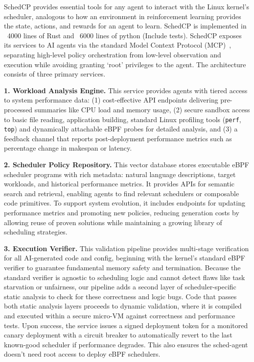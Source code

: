 \documentclass[preprint]{article}
\newcommand{\sys}{SchedCP\xspace}
\newcommand{\agent}{sched-agent\xspace}
\begin{document}
\sys provides essential tools for any agent to interact with the Linux kernel's scheduler, analogous to how an environment in reinforcement learning provides the state, actions, and rewards for an agent to learn. \sys is implemented in ~4000 lines of Rust and ~6000 lines of python (Include tests). \sys exposes its services to AI agents via the standard Model Context Protocol (MCP)~\cite{anthropic2024mcp}, separating high-level policy orchestration from low-level observation and execution while avoiding granting `root' privileges to the agent. The architecture consists of three primary services.


\textbf{1. Workload Analysis Engine.} This service provides agents with tiered access to system performance data: (1) cost-effective API endpoints delivering pre-processed summaries like CPU load and memory usage, (2) secure sandbox access to basic file reading, application building, standard Linux profiling tools (\texttt{perf}, \texttt{top}) and dynamically attachable eBPF probes for detailed analysis, and (3) a feedback channel that reports post-deployment performance metrics such as percentage change in makespan or latency.

\textbf{2. Scheduler Policy Repository.} This vector database stores executable eBPF scheduler programs with rich metadata: natural language descriptions, target workloads, and historical performance metrics. It provides APIs for semantic search and retrieval, enabling agents to find relevant schedulers or composable code primitives. To support system evolution, it includes endpoints for updating performance metrics and promoting new policies, reducing generation costs by allowing reuse of proven solutions while maintaining a growing library of scheduling strategies.

\textbf{3. Execution Verifier.} This validation pipeline provides multi-stage verification for all AI-generated code and config, beginning with the kernel's standard eBPF verifier to guarantee fundamental memory safety and termination. Because the standard verifier is agnostic to scheduling logic and cannot detect flaws like task starvation or unfairness, our pipeline adds a second layer of scheduler-specific static analysis to check for these correctness and logic bugs. Code that passes both static analysis layers proceeds to dynamic validation, where it is compiled and executed within a secure micro-VM against correctness and performance tests. Upon success, the service issues a signed deployment token for a monitored canary deployment with a circuit breaker to automatically revert to the last known-good scheduler if performance degrades. This also ensures the \agent doesn't need root access to deploy eBPF schedulers.
\end{document}
